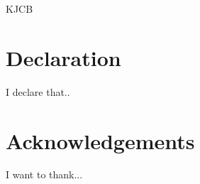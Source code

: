 \documentclass[a4paper,11pt,usegeometry]{scrreprt} %
\begin{document}
KJCB

\justifying

\chapter*{Declaration}
I declare that..

\chapter*{Acknowledgements}
I want to thank...

\tableofcontents
{}



\listoffigures	%
\listoftables  %









\printbibliography[heading=bibintoc,title={Bibliography}]
\end{document}
